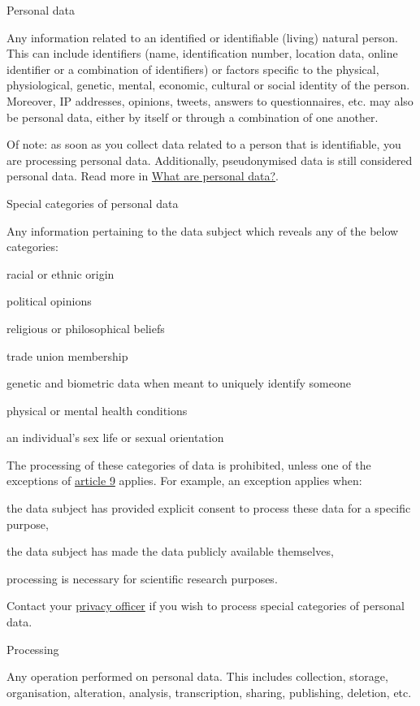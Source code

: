 \documentclass[
]{book}
\begin{document}
Personal data

Any information related to an identified or identifiable (living) natural
person. This can include identifiers (name, identification number, location
data, online identifier or a combination of identifiers) or factors specific
to the physical, physiological, genetic, mental, economic, cultural or social
identity of the person. Moreover, IP addresses, opinions, tweets, answers to
questionnaires, etc. may also be personal data, either by itself or through a
combination of one another.

Of note: as soon as you collect data related to a person that is identifiable,
you are processing personal data. Additionally, pseudonymised data is still
considered personal data. Read more in
\protect\hyperlink{personal-data}{What are personal data?}.

Special categories of personal data

Any information pertaining to the data subject which reveals any of the below categories:

racial or ethnic origin

political opinions

religious or philosophical beliefs

trade union membership

genetic and biometric data when meant to uniquely identify someone

physical or mental health conditions

an individual's sex life or sexual orientation

The processing of these categories of data is prohibited, unless one of
the exceptions of \href{https://gdpr-info.eu/art-9-gdpr/}{article 9}
applies. For example, an exception applies when:

the data subject has provided explicit consent to process these data for
a specific purpose,

the data subject has made the data publicly available themselves,

processing is necessary for scientific research purposes.

Contact your \protect\hyperlink{support}{privacy officer} if you wish to process special categories of personal data.

Processing

Any operation performed on personal data. This includes collection, storage,
organisation, alteration, analysis, transcription, sharing, publishing, deletion, etc.
\end{document}
